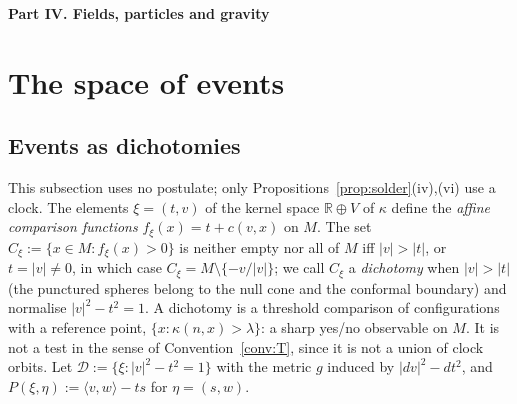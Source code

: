 \documentclass[aps,pra,onecolumn,superscriptaddress,nofootinbib,10pt]{revtex4-2}
\theoremstyle{definition}
\theoremstyle{remark}
\newcommand{\R}{\mathbb{R}}
\newcommand{\cD}{\mathcal{D}}
\newcommand{\ip}[2]{\langle #1,#2\rangle}
\newcommand{\paperpart}[1]{\par\bigskip\begin{center}\large\bfseries #1\end{center}\par\medskip}
\begin{document}
\paperpart{Part IV.  Fields, particles and gravity}

\section{The space of events}\label{sec:eventspace}

\subsection{Events as dichotomies}\label{sec:events}
This subsection uses no postulate; only Propositions~\ref{prop:solder}(iv),(vi) use a clock.  The
elements $\xi=(t,v)$ of the kernel space $\R\oplus V$ of $\kappa$ define the \emph{affine comparison
functions} $f_\xi(x)=t+c(v,x)$ on $M$.  The set $C_\xi:=\{x\in M:f_\xi(x)>0\}$ is neither empty nor all of $M$
iff $\lvert v\rvert>\lvert t\rvert$, or $t=\lvert v\rvert\ne0$, in which case $C_\xi=M\setminus\{-v/\lvert v\rvert\}$; we call
$C_\xi$ a \emph{dichotomy} when $\lvert v\rvert>\lvert t\rvert$ (the punctured spheres belong to the null cone and
the conformal boundary) and normalise $\lvert v\rvert^2-t^2=1$.  A dichotomy is a threshold comparison of
configurations with a reference point, $\{x:\kappa(n,x)>\lambda\}$: a sharp yes/no observable on $M$.  It is
not a test in the sense of Convention~\ref{conv:T}, since it is not a union of clock orbits.  Let
$\cD:=\{\xi:\lvert v\rvert^2-t^2=1\}$ with the metric $g$ induced by $\lvert dv\rvert^2-dt^2$, and
$P(\xi,\eta):=\ip{v}{w}-ts$ for $\eta=(s,w)$.
\end{document}
